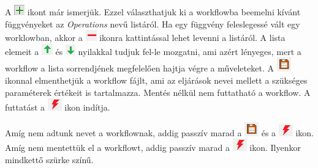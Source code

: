 \documentclass[a4paper,12pt]{article}
\begin{document}
A \includegraphics[width=0.4 cm]{zoldplus} ikont már ismerjük. Ezzel választhatjuk ki a workflowba beemelni kívánt függvényeket az \textit{Operations} nevű listáról.
Ha egy függvény feleslegessé vált egy worklowban, akkor a \includegraphics[width=0.4 cm]{pirosminus} ikonra kattintással lehet levenni a listáról.
A lista elemeit a \includegraphics[width=0.4 cm]{nyilfel} és \includegraphics[width=0.4 cm]{nyille} nyilakkal tudjuk fel-le mozgatni, ami azért lényeges, mert a workflow a lista sorrendjének megfelelően hajtja végre a műveleteket.
A \includegraphics[width=0.4 cm]{saveworkflow} ikonnal elmenthetjük a workflow fájlt, ami az eljárások nevei mellett a szükséges paraméterek értékeit is tartalmazza. Mentés nélkül nem futtatható a workflow.
A futtatást a \includegraphics[width=0.4 cm]{runworkflow} ikon indítja.

Amíg nem adtunk nevet a workflownak, addig passzív marad a \includegraphics[width=0.4 cm]{saveworkflow} és a \includegraphics[width=0.4 cm]{runworkflow} ikon. Amíg nem mentettük el a workflowt, addig passzív marad a \includegraphics[width=0.4 cm]{runworkflow} ikon. Ilyenkor mindkettő szürke színű.
\end{document}
